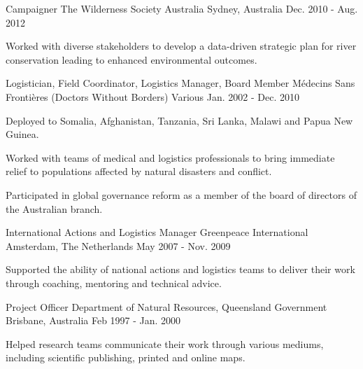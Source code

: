 \begin{cventries}
  \cventry
    {Campaigner} %
    {The Wilderness Society Australia} %
    {Sydney, Australia} %
    {Dec. 2010 - Aug. 2012} %
    {
      \begin{cvitems} %
        \item {Worked with diverse stakeholders to develop a data-driven strategic plan for river conservation leading to enhanced environmental outcomes.}
      \end{cvitems}
    }


  \cventry
    {Logistician, Field Coordinator, Logistics Manager, Board Member} %
    {Médecins Sans Frontières (Doctors Without Borders)} %
    {Various} %
    {Jan. 2002 - Dec. 2010} %
    {
      \begin{cvitems} %
        \item {Deployed to Somalia, Afghanistan, Tanzania, Sri Lanka, Malawi and Papua New Guinea.}
        \item {Worked with teams of medical and logistics professionals to bring immediate relief to populations affected by natural disasters and conflict.}
        \item {Participated in global governance reform as a member of the board of directors of the Australian branch.}
       \end{cvitems}
    }
    
  \cventry
    {International Actions and Logistics Manager} %
    {Greenpeace International} %
    {Amsterdam, The Netherlands} %
    {May 2007 - Nov. 2009} %
    {
      \begin{cvitems} %
        \item {Supported the ability of national actions and logistics teams to deliver their work through coaching, mentoring and technical advice.}
      \end{cvitems}
    }

  \cventry
    {Project Officer} %
    {Department of Natural Resources, Queensland Government} %
    {Brisbane, Australia} %
    {Feb 1997 - Jan. 2000} %
    {
      \begin{cvitems} %
        \item {Helped research teams communicate their work through various mediums, including scientific publishing, printed and online maps.}
      \end{cvitems}
    }



\end{cventries}
